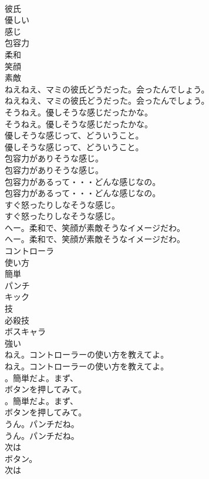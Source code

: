 \documentclass[8pt]{extreport}
\begin{document}
\begin{CJK}{UTF8}{min}
\\	彼氏
\\	優しい
\\	感じ
\\	包容力
\\	柔和
\\	笑顔
\\	素敵
\\	ねえねえ、マミの彼氏どうだった。会ったんでしょう。	
\\	ねえねえ、マミの彼氏どうだった。会ったんでしょう。 
\\	そうねえ。優しそうな感じだったかな。	
\\	そうねえ。優しそうな感じだったかな。 
\\	優しそうな感じって、どういうこと。	
\\	優しそうな感じって、どういうこと。 
\\	包容力がありそうな感じ。	
\\	包容力がありそうな感じ。 
\\	包容力があるって・・・どんな感じなの。	
\\	包容力があるって・・・どんな感じなの。 
\\	すぐ怒ったりしなそうな感じ。	
\\	すぐ怒ったりしなそうな感じ。 
\\	へー。柔和で、笑顔が素敵そうなイメージだわ。	
\\	へー。柔和で、笑顔が素敵そうなイメージだわ。 
\\	コントローラ
\\	使い方
\\	簡単
\\	パンチ
\\	キック
\\	技
\\	必殺技
\\	ボスキャラ
\\	強い
\\	ねえ。コントローラーの使い方を教えてよ。	
\\	ねえ。コントローラーの使い方を教えてよ。 
\\	。簡単だよ。まず、
\\	ボタンを押してみて。	
\\	。簡単だよ。まず、
\\	ボタンを押してみて。 
\\	うん。パンチだね。	
\\	うん。パンチだね。 
\\	次は
\\	ボタン。	
\\	次は

\end{CJK}
\end{document}
